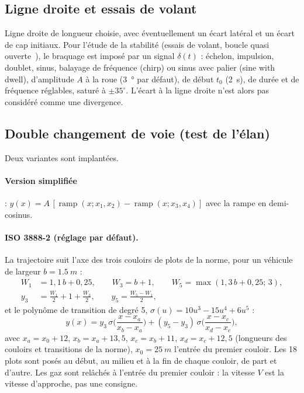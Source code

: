 \documentclass[11pt,a4paper]{article}
\begin{document}
\subsection{Ligne droite et essais de volant}
Ligne droite de longueur choisie, avec éventuellement un écart latéral et un écart de cap initiaux. Pour l'étude de la stabilité (essais de volant, boucle quasi ouverte~\cite{ISO14791}), le braquage est imposé par un signal $\delta(t)$ : échelon, impulsion, doublet, sinus, balayage de fréquence (chirp) ou sinus avec palier (sine with dwell), d'amplitude $A$ à la roue (\SI{3}{\degree} par défaut), de début $t_0$ (\SI{2}{s}), de durée et de fréquence réglables, saturé à $\pm35^\circ$. L'écart à la ligne droite n'est alors pas considéré comme une divergence.

\subsection{Double changement de voie (test de l'élan)}
Deux variantes sont implantées.

\paragraph{Version simplifiée} : $y(x)=A\,[\operatorname{ramp}(x;x_1,x_2)-\operatorname{ramp}(x;x_3,x_4)]$ avec la rampe en demi-cosinus.

\paragraph{ISO 3888-2 (réglage par défaut).} La trajectoire suit l'axe des trois couloirs de plots de la norme, pour un véhicule de largeur $b=\SI{1,5}{m}$ :
\begin{align}
 W_1&=1{,}1\,b+0{,}25,\qquad W_3=b+1,\qquad W_5=\max(1{,}3\,b+0{,}25;\,3),\\
 y_3&=\tfrac{W_1}{2}+1+\tfrac{W_3}{2},\qquad y_5=\tfrac{W_5-W_1}{2},
\end{align}
et le polynôme de transition de degré 5, $\sigma(u)=10u^3-15u^4+6u^5$ :
\begin{equation}
 y(x)=y_3\,\sigma\!\Big(\frac{x-x_a}{x_b-x_a}\Big)+(y_5-y_3)\,\sigma\!\Big(\frac{x-x_c}{x_d-x_c}\Big),
\end{equation}
avec $x_a=x_0+12$, $x_b=x_a+13{,}5$, $x_c=x_b+11$, $x_d=x_c+12{,}5$ (longueurs des couloirs et transitions de la norme), $x_0=\SI{25}{m}$ l'entrée du premier couloir. Les 18 plots sont posés au début, au milieu et à la fin de chaque couloir, de part et d'autre. Les gaz sont relâchés à l'entrée du premier couloir : la vitesse $V$ est la vitesse d'approche, pas une consigne.
\end{document}
